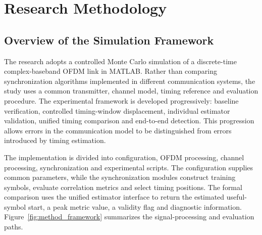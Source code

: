\chapter{Research Methodology}
\label{chap:methodology}

\section{Overview of the Simulation Framework}
The research adopts a controlled Monte Carlo simulation of a discrete-time complex-baseband OFDM link in MATLAB. Rather than comparing synchronization algorithms implemented in different communication systems, the study uses a common transmitter, channel model, timing reference and evaluation procedure. The experimental framework is developed progressively: baseline verification, controlled timing-window displacement, individual estimator validation, unified timing comparison and end-to-end detection. This progression allows errors in the communication model to be distinguished from errors introduced by timing estimation.

The implementation is divided into configuration, OFDM processing, channel processing, synchronization and experimental scripts. The configuration supplies common parameters, while the synchronization modules construct training symbols, evaluate correlation metrics and select timing positions. The formal comparison uses the unified estimator interface to return the estimated useful-symbol start, a peak metric value, a validity flag and diagnostic information. Figure~\ref{fig:method_framework} summarizes the signal-processing and evaluation paths.


